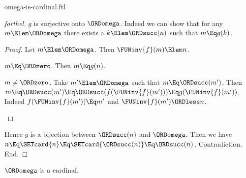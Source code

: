 \documentclass{stex}
\begin{document}
\begin{smodule}{omega-is-cardinal.ftl}
\begin{proof}[forthel]
    $g$ is surjective onto $\ORDomega$.
    Indeed we can show that for any $m \Elem \ORDomega$ there exists a $k \Elem \ORDsucc(n)$ such that $m \Eq g(k)$.
    \begin{proof}
      Let $m \Elem \ORDomega$.
      Then $\FUNinv{f}(m) \Elem n$.

      \begin{case}{$m \Eq \ORDzero$.}
        Then $m \Eq g(n)$.
      \end{case}

      \begin{case}{$m \neq \ORDzero$.}
        Take $m' \Elem \ORDomega$ such that $m \Eq \ORDsucc(m')$.
        Then $m
          \Eq \ORDsucc(m')
          \Eq \ORDsucc(f(\FUNinv{f}(m')))
          \Eq g(\FUNinv{f}(m'))$.
        Indeed $f(\FUNinv{f}(m')) \Eq m'$ and $\FUNinv{f}(m') \ORDless n$.
      \end{case}
    \end{proof}

    Hence $g$ is a bijection between $\ORDsucc(n)$ and $\ORDomega$.
    Then we have $n
      \Eq \SETcard{n}
      \Eq \SETcard{\ORDsucc(n)}
      \Eq \ORDsucc(n)$.
    Contradiction.
  End.
\end{proof}

\begin{corollary}[forthel,id=SET_THEORY_07_2717623053713408]
  $\ORDomega$ is a cardinal.
\end{corollary}
\end{smodule}
\end{document}
